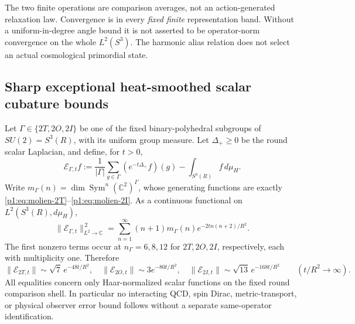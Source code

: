 \documentclass[11pt]{article}
\begin{document}
\begin{remark}
The two finite operations are comparison averages, not an action-generated
relaxation law. Convergence is in every \emph{fixed finite} representation
band. Without a uniform-in-degree angle bound it is not asserted to be
operator-norm convergence on the whole $L^2(S^3)$. The harmonic alias
relation does not select an actual cosmological primordial state.
\end{remark}

\subsection{Sharp exceptional heat-smoothed scalar cubature bounds}
\label{p1b:sec:cc16-heat-cubature}
\begin{theorem}
\label{p1b:thm:cc16-heat-cubature-error}
Let $\Gamma\in\{2T,2O,2I\}$ be one of the fixed binary-polyhedral
subgroups of $SU(2)=S^3(R)$, with its uniform group measure.
Let $\Delta_+\geq0$ be the round scalar Laplacian, and define, for $t>0$,
\[
 \mathcal E_{\Gamma,t}f:=\frac1{|\Gamma|}\sum_{g\in\Gamma}
       (e^{-t\Delta_+}f)(g)-\int_{S^3(R)}f\,d\mu_H.
\]
Write $m_\Gamma(n)=\dim\operatorname{Sym}^{n}(\mathbb C^2)^\Gamma$,
whose generating functions are exactly
\eqref{p1:eq:molien-2T}--\eqref{p1:eq:molien-2I}.
As a continuous functional on $L^2(S^3(R),d\mu_H)$,
\begin{equation}\label{p1b:eq:cc16-heat-cubature-norm}
 \boxed{\|\mathcal E_{\Gamma,t}\|_{L^2\to\mathbb C}^{\,2}
 =\sum_{n=1}^\infty (n+1)m_\Gamma(n)
      e^{-2tn(n+2)/R^2}.}
\end{equation}
The first nonzero terms occur at $n_\Gamma=6,8,12$ for
$2T,2O,2I$, respectively, each with multiplicity one. Therefore
\[
 \|\mathcal E_{2T,t}\|\sim\sqrt7\,e^{-48t/R^2},\quad
 \|\mathcal E_{2O,t}\|\sim3e^{-80t/R^2},\quad
 \|\mathcal E_{2I,t}\|\sim\sqrt{13}\,e^{-168t/R^2}
 \qquad(t/R^2\longrightarrow\infty).
\]
All equalities concern only Haar-normalized scalar functions on the
fixed round comparison shell. In particular no interacting QCD,
spin Dirac, metric-transport, or physical observer error bound follows
without a separate same-operator identification.
\end{theorem}
\end{document}
